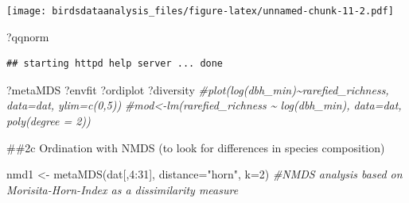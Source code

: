 \documentclass[
]{article}
\newenvironment{Shaded}{\begin{snugshade}}{\end{snugshade}}
\newcommand{\AttributeTok}[1]{\textcolor[rgb]{0.77,0.63,0.00}{#1}}
\newcommand{\CommentTok}[1]{\textcolor[rgb]{0.56,0.35,0.01}{\textit{#1}}}
\newcommand{\DecValTok}[1]{\textcolor[rgb]{0.00,0.00,0.81}{#1}}
\newcommand{\FunctionTok}[1]{\textcolor[rgb]{0.00,0.00,0.00}{#1}}
\newcommand{\NormalTok}[1]{#1}
\newcommand{\OtherTok}[1]{\textcolor[rgb]{0.56,0.35,0.01}{#1}}
\newcommand{\SpecialCharTok}[1]{\textcolor[rgb]{0.00,0.00,0.00}{#1}}
\newcommand{\StringTok}[1]{\textcolor[rgb]{0.31,0.60,0.02}{#1}}
\begin{document}
\texttt{[image: birdsdataanalysis\_files/figure-latex/unnamed-chunk-11-2.pdf]}

\begin{Shaded}
\begin{Highlighting}[]
\NormalTok{?qqnorm}
\end{Highlighting}
\end{Shaded}

\begin{verbatim}
## starting httpd help server ... done
\end{verbatim}

\begin{Shaded}
\begin{Highlighting}[]
\NormalTok{?metaMDS}
\NormalTok{?envfit}
\NormalTok{?ordiplot}
\NormalTok{?diversity}
\CommentTok{\#plot(log(dbh\_min)\textasciitilde{}rarefied\_richness, data=dat, ylim=c(0,5))}
\CommentTok{\#mod\textless{}{-}lm(rarefied\_richness \textasciitilde{} log(dbh\_min), data=dat, poly(degree = 2))}
\end{Highlighting}
\end{Shaded}

\#\#2c Ordination with NMDS (to look for differences in species
composition)

\begin{Shaded}
\begin{Highlighting}[]
\NormalTok{nmd1 }\OtherTok{\textless{}{-}} \FunctionTok{metaMDS}\NormalTok{(dat[,}\DecValTok{4}\SpecialCharTok{:}\DecValTok{31}\NormalTok{], }\AttributeTok{distance=}\StringTok{"horn"}\NormalTok{, }\AttributeTok{k=}\DecValTok{2}\NormalTok{) }\CommentTok{\#NMDS analysis based on Morisita{-}Horn{-}Index as a dissimilarity measure}
\end{Highlighting}
\end{Shaded}
\end{document}
